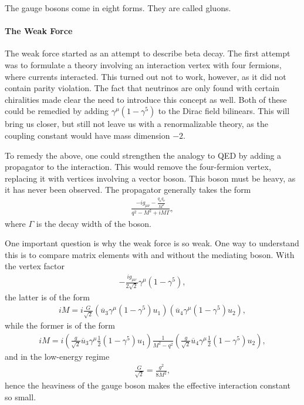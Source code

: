 The gauge bosons come in eight forms. They are called gluons.

\paragraph{The Weak Force}
The weak force started as an attempt to describe beta decay. The first attempt was to formulate a theory involving an interaction vertex with four fermions, where currents interacted. This turned out not to work, however, as it did not contain parity violation. The fact that neutrinos are only found with certain chiralities made clear the need to introduce this concept as well. Both of these could be remedied by adding $\gamma^{\mu}(1 - \gamma^{5})$ to the Dirac field bilinears. This will bring us closer, but still not leave us with a renormalizable theory, as the coupling constant would have mass dimension $-2$.

To remedy the above, one could strengthen the analogy to QED by adding a propagator to the interaction. This would remove the four-fermion vertex, replacing it with vertices involving a vector boson. This boson must be heavy, as it has never been observed. The propagator generally takes the form
\begin{align*}
	\frac{-ig_{\mu\nu} - \frac{q_{\mu}q_{\nu}}{M^{2}}}{q^{2} - M^{2} + iM\Gamma},
\end{align*}
where $\Gamma$ is the decay width of the boson.

One important question is why the weak force is so weak. One way to understand this is to compare matrix elements with and without the mediating boson. With the vertex factor
\begin{align*}
	-\frac{ig_{\mu\nu}}{2\sqrt{2}}\gamma^{\mu}(1 - \gamma^{5}),
\end{align*}
the latter is of the form
\begin{align*}
	iM = i\frac{G}{\sqrt{2}}\left(\overline{u}_{3}\gamma^{\mu}(1 - \gamma^{5})u_{1}\right)\left(\overline{u}_{4}\gamma^{\mu}(1 - \gamma^{5})u_{2}\right),
\end{align*}
while the former is of the form
\begin{align*}
	iM = i\left(\frac{g}{\sqrt{2}}\overline{u}_{3}\gamma^{\mu}\frac{1}{2}(1 - \gamma^{5})u_{1}\right)\frac{1}{M^{2} - q^{2}}\left(\frac{g}{\sqrt{2}}\overline{u}_{4}\gamma^{\mu}\frac{1}{2}(1 - \gamma^{5})u_{2}\right),
\end{align*}
and in the low-energy regime
\begin{align*}
	\frac{G}{\sqrt{2}} = \frac{g^{2}}{8M^{2}},
\end{align*}
hence the heaviness of the gauge boson makes the effective interaction constant so small.

